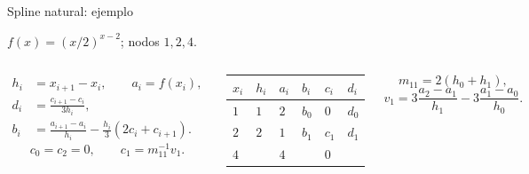 \documentclass[original_version/main.tex]{subfiles}
\begin{document}
\begin{frame}[t]{Spline natural: ejemplo}
\par\noindent\begin{minipage}[t][9mm][t]{\textwidth}\small\strut $f(x)=(x/2)^{x-2}$; nodos $1,2,4$.\end{minipage}\par\nointerlineskip
\begin{columns}[T]\scriptsize\begin{align*}
h_i&=x_{i+1}-x_i,\qquad a_i=f(x_i),\\
d_i&=\frac{c_{i+1}-c_i}{3h_i},\\
b_i&=\frac{a_{i+1}-a_i}{h_i}-\frac{h_i}{3}(2c_i+c_{i+1}).
\end{align*}\scriptsize\[c_0=c_2=0,\qquad c_1=m_{11}^{-1}v_1.\]\begin{minipage}[t]{\textwidth}\begingroup\scriptsize\setlength{\tabcolsep}{2pt}\begin{center}\begin{tabular}{|C{.12\textwidth}|C{.12\textwidth}|C{.12\textwidth}|C{.12\textwidth}|C{.12\textwidth}|C{.12\textwidth}|}\hline
\rule[-2mm]{0pt}{6mm}$x_i$&$h_i$&$a_i$&$b_i$&$c_i$&$d_i$\\\hline
\rule[-2.5mm]{0pt}{7mm}$1$&$1$&$2$&$b_0$&$0$&$d_0$\\\hline
\rule[-2.5mm]{0pt}{7mm}$2$&$2$&$1$&$b_1$&$c_1$&$d_1$\\\hline
\rule[-2.5mm]{0pt}{7mm}$4$&&$4$&&$0$&\\\hline
\end{tabular}\end{center}\endgroup\end{minipage}\par
\scriptsize\[m_{11}=2(h_0+h_1),\]\[v_1=3\frac{a_2-a_1}{h_1}-3\frac{a_1-a_0}{h_0}.\]\end{columns}
\end{frame}
\end{document}

